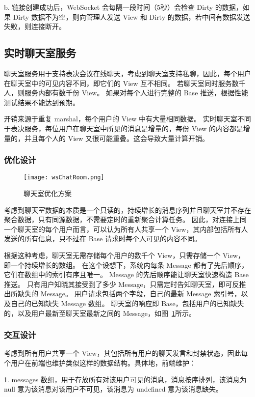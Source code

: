   \quad{}\quad{}b. 链接创建成功后，WebSocket 会每隔一段时间（5秒）会检查 Dirty 的数据，如果 Dirty 数据不为空，则向管理人发送 View 和 Dirty 的数据，若中间有数据发送失败，则连接断开。

\subsection{实时聊天室服务}
聊天室服务用于支持表决会议在线聊天，考虑到聊天室支持私聊，因此，每个用户在聊天室中的可见内容不同，即它们的 View 互不相同。
若聊天室同时服务数千人，则服务内部有数千份 View。
如果对每个人进行完整的 Base 推送，根据性能测试结果不能达到预期。

开销来源于重复 marshal，每个用户的 View 中有大量相同数据。
实时聊天室不同于表决服务，每位用户在聊天室中所见的消息是增量的，每份 View 的内容都是增量的，并且每个人的 View 又很可能重叠。这会导致大量计算开销。

\subsubsection{优化设计}
\begin{figure}[!htp]
  \centering
  \texttt{[image: wsChatRoom.png]}
  \caption{聊天室优化方案}
  \label{fig:wsChatRoom}
\end{figure}
考虑到聊天室数据的本质是一个只读的，持续增长的消息序列并且聊天室并不存在聚合数据，只有同源数据，不需要定时的重新聚合计算任务。
因此，对连接上同一个聊天室的每个用户而言，可以认为所有人共享一个 View，其内部包括所有人发送的所有信息，只不过在 Base 请求时每个人可见的内容不同。

根据这种考虑，聊天室无需存储每个用户的数千个 View，只需存储一个 View，即一个持续增长的数组。
在这个设想下，系统内每条 Message 都有了先后顺序，它们在数组中的索引有序且唯一。
Message 的先后顺序能让聊天室快速构造 Base 推送。
只有用户知晓其接受到了多少 Message，只需定时告知聊天室，即可反推出所缺失的 Message。
用户请求包括两个字段，自己的最新 Message 索引号，以及自己的已知缺失 Message 数组。
聊天室的响应即 Base，包括用户的已知缺失的，以及用户最新至聊天室最新之间的 Message，如图~\ref{fig:wsChatRoom}所示。


  \subsubsection{交互设计}
  考虑到所有用户共享一个 View，其包括所有用户的聊天发言和封禁状态，因此每个用户在前端也维护类似这样的数据结构。具体地，前端维护：

  1. messages 数组，用于存放所有对该用户可见的消息，消息按序排列，该消息为 null 意为该消息对该用户不可见，该消息为 undefined 意为该消息缺失。


